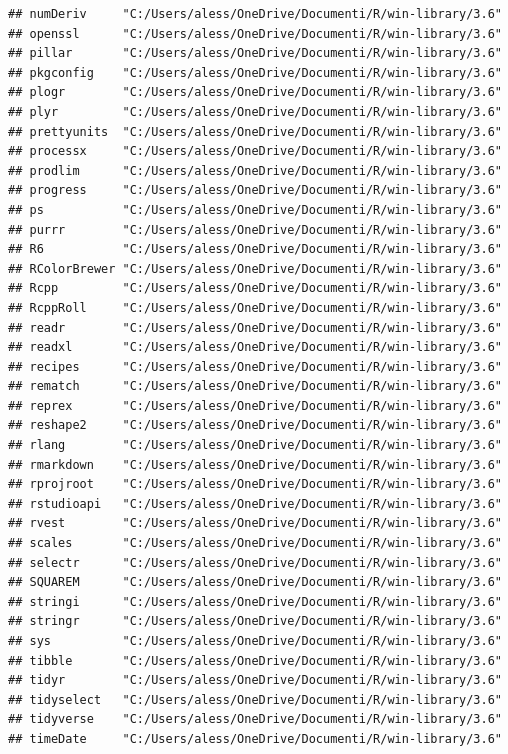 \documentclass[]{article}
\begin{document}
\begin{verbatim}
## numDeriv     "C:/Users/aless/OneDrive/Documenti/R/win-library/3.6"
## openssl      "C:/Users/aless/OneDrive/Documenti/R/win-library/3.6"
## pillar       "C:/Users/aless/OneDrive/Documenti/R/win-library/3.6"
## pkgconfig    "C:/Users/aless/OneDrive/Documenti/R/win-library/3.6"
## plogr        "C:/Users/aless/OneDrive/Documenti/R/win-library/3.6"
## plyr         "C:/Users/aless/OneDrive/Documenti/R/win-library/3.6"
## prettyunits  "C:/Users/aless/OneDrive/Documenti/R/win-library/3.6"
## processx     "C:/Users/aless/OneDrive/Documenti/R/win-library/3.6"
## prodlim      "C:/Users/aless/OneDrive/Documenti/R/win-library/3.6"
## progress     "C:/Users/aless/OneDrive/Documenti/R/win-library/3.6"
## ps           "C:/Users/aless/OneDrive/Documenti/R/win-library/3.6"
## purrr        "C:/Users/aless/OneDrive/Documenti/R/win-library/3.6"
## R6           "C:/Users/aless/OneDrive/Documenti/R/win-library/3.6"
## RColorBrewer "C:/Users/aless/OneDrive/Documenti/R/win-library/3.6"
## Rcpp         "C:/Users/aless/OneDrive/Documenti/R/win-library/3.6"
## RcppRoll     "C:/Users/aless/OneDrive/Documenti/R/win-library/3.6"
## readr        "C:/Users/aless/OneDrive/Documenti/R/win-library/3.6"
## readxl       "C:/Users/aless/OneDrive/Documenti/R/win-library/3.6"
## recipes      "C:/Users/aless/OneDrive/Documenti/R/win-library/3.6"
## rematch      "C:/Users/aless/OneDrive/Documenti/R/win-library/3.6"
## reprex       "C:/Users/aless/OneDrive/Documenti/R/win-library/3.6"
## reshape2     "C:/Users/aless/OneDrive/Documenti/R/win-library/3.6"
## rlang        "C:/Users/aless/OneDrive/Documenti/R/win-library/3.6"
## rmarkdown    "C:/Users/aless/OneDrive/Documenti/R/win-library/3.6"
## rprojroot    "C:/Users/aless/OneDrive/Documenti/R/win-library/3.6"
## rstudioapi   "C:/Users/aless/OneDrive/Documenti/R/win-library/3.6"
## rvest        "C:/Users/aless/OneDrive/Documenti/R/win-library/3.6"
## scales       "C:/Users/aless/OneDrive/Documenti/R/win-library/3.6"
## selectr      "C:/Users/aless/OneDrive/Documenti/R/win-library/3.6"
## SQUAREM      "C:/Users/aless/OneDrive/Documenti/R/win-library/3.6"
## stringi      "C:/Users/aless/OneDrive/Documenti/R/win-library/3.6"
## stringr      "C:/Users/aless/OneDrive/Documenti/R/win-library/3.6"
## sys          "C:/Users/aless/OneDrive/Documenti/R/win-library/3.6"
## tibble       "C:/Users/aless/OneDrive/Documenti/R/win-library/3.6"
## tidyr        "C:/Users/aless/OneDrive/Documenti/R/win-library/3.6"
## tidyselect   "C:/Users/aless/OneDrive/Documenti/R/win-library/3.6"
## tidyverse    "C:/Users/aless/OneDrive/Documenti/R/win-library/3.6"
## timeDate     "C:/Users/aless/OneDrive/Documenti/R/win-library/3.6"

\end{verbatim}
\end{document}
